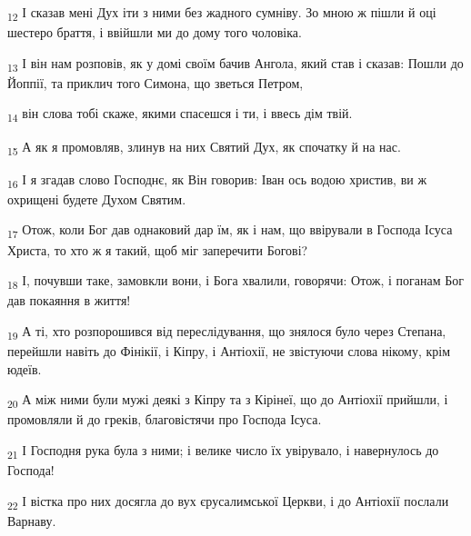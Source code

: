 \begin{tcolorbox}
\textsubscript{12} І сказав мені Дух іти з ними без жадного сумніву. Зо мною ж пішли й оці шестеро браття, і ввійшли ми до дому того чоловіка.
\end{tcolorbox}
\begin{tcolorbox}
\textsubscript{13} І він нам розповів, як у домі своїм бачив Ангола, який став і сказав: Пошли до Йоппії, та приклич того Симона, що зветься Петром,
\end{tcolorbox}
\begin{tcolorbox}
\textsubscript{14} він слова тобі скаже, якими спасешся і ти, і ввесь дім твій.
\end{tcolorbox}
\begin{tcolorbox}
\textsubscript{15} А як я промовляв, злинув на них Святий Дух, як спочатку й на нас.
\end{tcolorbox}
\begin{tcolorbox}
\textsubscript{16} І я згадав слово Господнє, як Він говорив: Іван ось водою христив, ви ж охрищені будете Духом Святим.
\end{tcolorbox}
\begin{tcolorbox}
\textsubscript{17} Отож, коли Бог дав однаковий дар їм, як і нам, що ввірували в Господа Ісуса Христа, то хто ж я такий, щоб міг заперечити Богові?
\end{tcolorbox}
\begin{tcolorbox}
\textsubscript{18} І, почувши таке, замовкли вони, і Бога хвалили, говорячи: Отож, і поганам Бог дав покаяння в життя!
\end{tcolorbox}
\begin{tcolorbox}
\textsubscript{19} А ті, хто розпорошився від переслідування, що знялося було через Степана, перейшли навіть до Фінікії, і Кіпру, і Антіохії, не звістуючи слова нікому, крім юдеїв.
\end{tcolorbox}
\begin{tcolorbox}
\textsubscript{20} А між ними були мужі деякі з Кіпру та з Кірінеї, що до Антіохії прийшли, і промовляли й до греків, благовістячи про Господа Ісуса.
\end{tcolorbox}
\begin{tcolorbox}
\textsubscript{21} І Господня рука була з ними; і велике число їх увірувало, і навернулось до Господа!
\end{tcolorbox}
\begin{tcolorbox}
\textsubscript{22} І вістка про них досягла до вух єрусалимської Церкви, і до Антіохії послали Варнаву.
\end{tcolorbox}
